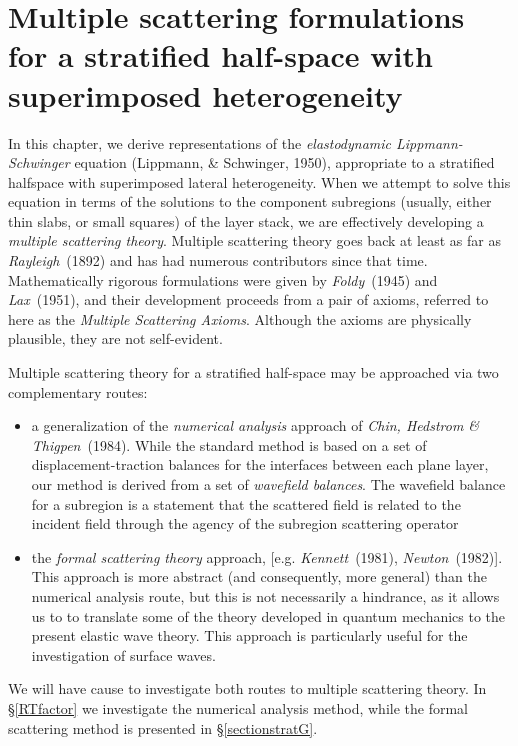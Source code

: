 
\chapter[Multiple scattering formulations]
{Multiple scattering formulations for a stratified half-space 
with superimposed heterogeneity} \label{stratG}








In this chapter, we derive
representations of the {\em elastodynamic Lippmann-Schwinger\/} 
equation (Lippmann, \& Schwinger, 1950), appropriate to a stratified halfspace 
with superimposed lateral heterogeneity. When we attempt to solve this 
equation in terms of the solutions to the component subregions (usually, 
either thin slabs, or small squares) of the layer stack, we are effectively developing a {\em multiple scattering 
theory\/}.
Multiple scattering theory goes back at least as far as {\em Rayleigh\/}~(1892)
and has had numerous contributors since that time. Mathematically 
rigorous formulations were given by {\em Foldy\/}~(1945)
and {\em Lax\/}~(1951), and their development proceeds from a pair of 
axioms, referred to here as the {\em Multiple Scattering Axioms\/}.
Although the axioms are physically plausible, they are  not self-evident.

 Multiple scattering theory for a stratified half-space may be 
approached via two complementary routes:
\begin{itemize}
\item a generalization of the {\em numerical analysis\/} approach of {\em Chin, Hedstrom \& 
Thigpen\/}~(1984). While the standard method is based on a set of 
displacement-traction balances for the interfaces between each plane 
layer, our method is derived from a set of {\em wavefield balances\/}. 
The wavefield balance for a subregion is a statement that the scattered 
field is related to the incident field through the agency of the 
subregion scattering operator
\item the {\em formal scattering theory\/} approach, [e.g. {\em 
Kennett\/}~(1981), {\em Newton\/}~(1982)]. This approach is more abstract 
(and consequently, more general) 
than the numerical analysis route, but this is not necessarily a 
hindrance, as it allows us to to translate some of the theory developed in 
quantum mechanics to the present elastic wave theory. This approach is 
particularly useful for the investigation of surface waves. 
\end{itemize}
We will have cause to investigate both routes to multiple scattering 
theory. In \S\ref{RTfactor} we investigate the numerical analysis method, 
while the formal scattering method is presented in \S\ref{sectionstratG}.

